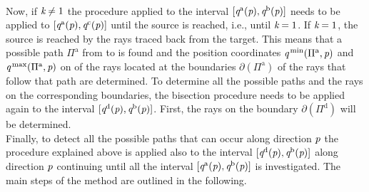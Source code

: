\\ \indent Now, if $\textit{k}\neq1$ the procedure applied to the interval 
$[\textit{q}^{\textrm{a}}(\textit{p}), \textit{q}^{\textrm{b}}(\textit{p})]$ needs to be applied to $[\textit{q}^{\textrm{a}}(\textit{p}),\textit{q}^{\textrm{c}}(\textit{p})]$ until the source is reached, i.e., until $\textit{k}=1$. If $\textit{k}=1$, the source is reached by the rays traced back from the target. This means that a possible path $\Pi^{\textrm{a}}$ from  to  is found and the position coordinates $\textit{q}^{\textrm{\,min}}(\Pi^{\textrm{a}}, \textit{p})$ and $\textit{q}^{\textrm{\,max}}(\Pi^{\textrm{a}}, \textit{p})$ on  of the rays located at the boundaries $\partial$$(\Pi^{\textrm{a}})$ of the rays that follow that path are determined. To determine all the possible paths and the rays on the corresponding boundaries, the bisection procedure needs to be applied again to the interval $[\textit{q}^{\textrm{d}}(\textit{p}), \textit{q}^{\textrm{b}}(\textit{p})]$. First, the rays on the boundary $\partial$$(\Pi^{\textrm{d}})$ will be determined. 
\\ \indent 
Finally, to detect all the possible paths that can occur along direction $\textit{p}$ the procedure explained above is applied also to the interval $[\textit{q}^{\textrm{d}}(\textit{p}), \textit{q}^{\textrm{b}}(\textit{p})]$ along direction $\textit{p}$ continuing until all the interval $[\textit{q}^{\textrm{a}}(\textit{p}), \textit{q}^{\textrm{b}}(\textit{p})]$ is investigated. 
The main steps of the method are outlined in the following.
